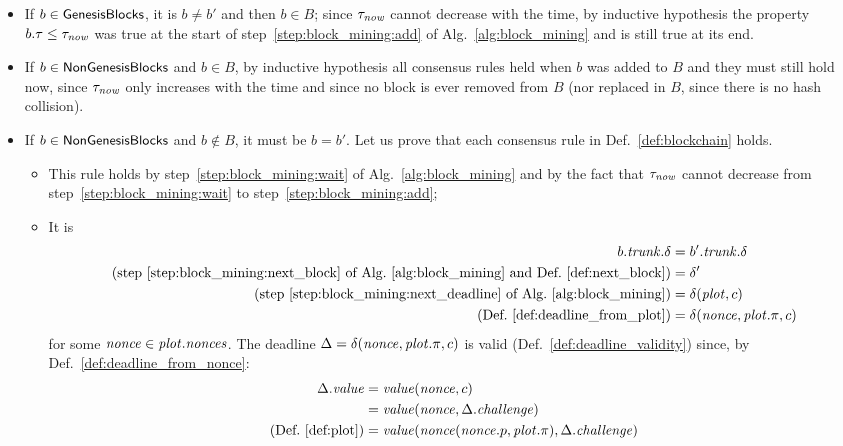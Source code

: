   \begin{itemize}
  \item If $b\in{\mathsf{GenesisBlocks}}$, it is $b\not=b'$ and then $b\in B$; since $\tau_{\mathit{now}}$
    cannot decrease with the time, by inductive hypothesis
    the property $b.\tau\le\tau_{\mathit{now}}$ was true at the start of
    step~\ref{step:block_mining:add} of Alg.~\ref{alg:block_mining}
    and is still true at its end.
  \item If $b\in{\mathsf{NonGenesisBlocks}}$ and $b\in B$, by inductive hypothesis
    all consensus rules held when $b$ was added to
    $B$ and they must still hold now, since $\tau_{\mathit{now}}$ only
    increases with the time and since no block is ever removed from $B$
    (nor replaced in $B$, since there is no hash collision).
  \item If $b\in{\mathsf{NonGenesisBlocks}}$ and $b\not\in B$, it must be $b=b'$. Let us prove that each consensus rule
    in Def.~\ref{def:blockchain} holds.
    \begin{itemize}
    \item[\ref{prop:consensus:no_future}] This rule holds by step~\ref{step:block_mining:wait} of
      Alg.~\ref{alg:block_mining} and by the fact
      that $\tau_{\mathit{now}}$ cannot decrease from step~\ref{step:block_mining:wait} to
      step~\ref{step:block_mining:add};
    \item[\ref{prop:consensus:valid}] It is
      \begin{align*}
        b.{\mathit{trunk}}.\delta&=b'.{\mathit{trunk}}.\delta\\
        \text{(step~\ref{step:block_mining:next_block} of Alg.~\ref{alg:block_mining} and Def.~\ref{def:next_block})}&=\delta'\\
        \text{(step~\ref{step:block_mining:next_deadline} of Alg.~\ref{alg:block_mining})}&=
        \delta({\mathit{plot}},c)\\
        \text{(Def.~\ref{def:deadline_from_plot})}&=\delta({\mathit{nonce}},{\mathit{plot}}.\pi,c)
      \end{align*}
      for some ${\mathit{nonce}}\in{\mathit{plot}}.{\mathit{nonces}}$. The deadline $\Delta=\delta({\mathit{nonce}},{\mathit{plot}}.\pi,c)$ is valid
      (Def.~\ref{def:deadline_validity}) since, by Def.~\ref{def:deadline_from_nonce}:
      \begin{align*}
        \Delta.\mathit{value}&=\mathit{value}(\nonce,c)\\
        &=\mathit{value}(\nonce,\Delta.\challenge)\\
        \text{(Def.~\ref{def:plot})}&=\mathit{value}(\nonce(\nonce.p,\plot.\pi),\Delta.\challenge)\\

\end{align*}
\end{itemize}
\end{itemize}
